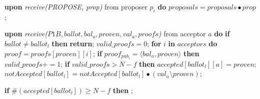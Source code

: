 \begin{algorithm}
\begin{algorithmic}[1]
		\State
		\State \textbf{upon} \textit{receive(PROPOSE, prop)} from proposer $p_i$ \textbf{do} 
		\State \hspace{\algorithmicindent} $proposals = proposals \bullet prop$;
		
		\State
		\State \textbf{upon} \textit{receive($P1B, ballot, bal_a, proven,val_a, proofs$)} from acceptor $a$ \textbf{do}
		\State \hspace{\algorithmicindent} \textbf{if} $ballot \neq ballot_l$ \textbf{then}
		\State \hspace{\algorithmicindent}\hspace{\algorithmicindent} \textbf{return};
		\State
		\State \hspace{\algorithmicindent} $valid\_proofs = 0$; 
		\State \hspace{\algorithmicindent} \textbf{for} $i$ \textbf{in} $acceptors$ \textbf{do}
		\State \hspace{\algorithmicindent}\hspace{\algorithmicindent} $proof = proofs[proven][i]$;
		\State \hspace{\algorithmicindent}\hspace{\algorithmicindent} \textbf{if} $proof_{pub_i} = \langle bal_a, proven \rangle$ \textbf{then}
		\State \hspace{\algorithmicindent}\hspace{\algorithmicindent}\hspace{\algorithmicindent} 
		$valid\_proofs \mathrel{+{=}} 1$;
		\State
		\State \hspace{\algorithmicindent} \textbf{if} $valid\_proofs > N-f$ \textbf{then}
		\State \hspace{\algorithmicindent}\hspace{\algorithmicindent}\hspace{\algorithmicindent} $accepted[ballot_l][a] = proven$;
		\State \hspace{\algorithmicindent}\hspace{\algorithmicindent}\hspace{\algorithmicindent}		$notAccepted[ballot_l] = notAccepted[ballot_l] \bullet (val_a \setminus proven)$;		
		
		\State 
		\State \hspace{\algorithmicindent}\hspace{\algorithmicindent} \textbf{if} $\#(accepted[ballot_l]) \geq N-f$ \textbf{then} 
		\State \hspace{\algorithmicindent}\hspace{\algorithmicindent}\hspace{\algorithmicindent} ;
		

\end{algorithmic}
\end{algorithm}
